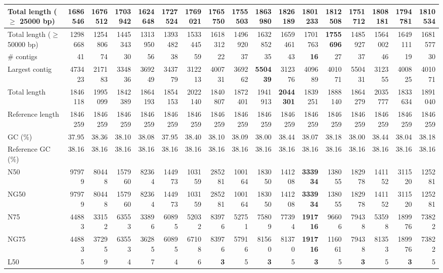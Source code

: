 \documentclass[12pt,a4paper]{article}
\begin{document}
\begin{table}[ht]
\begin{center}
\begin{tabular}{|l*{16}{|r}|}
Total length ($\geq$ 25000 bp) & 1686546 & 1676512 & 1703942 & 1624648 & 1727524 & 1769021 & 1765750 & 1755503 & {\bf 1863980} & 1826189 & 1801233 & 1812508 & 1751712 & 1808181 & 1794781 & 1810534 \\ \hline
Total length ($\geq$ 50000 bp) & 1298668 & 1254806 & 1445343 & 1313950 & 1393482 & 1533445 & 1618312 & 1496920 & 1632852 & 1659461 & 1701763 & {\bf 1755696} & 1485927 & 1564002 & 1649111 & 1681577 \\ \hline
\# contigs & 41 & 74 & 30 & 56 & 38 & 59 & 22 & 37 & 35 & 43 & {\bf 16} & 27 & 37 & 46 & 19 & 30 \\ \hline
Largest contig & 473423 & 217183 & 334836 & 369249 & 343779 & 312213 & 400731 & 369262 & {\bf 550439} & 312376 & 409689 & 401071 & 550431 & 312355 & 400825 & 401071 \\ \hline
Total length & 1846118 & 1995099 & 1842389 & 1864193 & 1854153 & 2022140 & 1840807 & 1872401 & 1941913 & {\bf 2044301} & 1839251 & 1888140 & 1864279 & 2035777 & 1833634 & 1891040 \\ \hline
Reference length & 1846259 & 1846259 & 1846259 & 1846259 & 1846259 & 1846259 & 1846259 & 1846259 & 1846259 & 1846259 & 1846259 & 1846259 & 1846259 & 1846259 & 1846259 & 1846259 \\ \hline
GC (\%) & 37.95 & 38.36 & 38.10 & 38.08 & 37.95 & 38.40 & 38.10 & 38.09 & 38.00 & 38.44 & 38.07 & 38.18 & 38.00 & 38.44 & 38.04 & 38.18 \\ \hline
Reference GC (\%) & 38.16 & 38.16 & 38.16 & 38.16 & 38.16 & 38.16 & 38.16 & 38.16 & 38.16 & 38.16 & 38.16 & 38.16 & 38.16 & 38.16 & 38.16 & 38.16 \\ \hline
N50 & 97979 & 80448 & 157960 & 82364 & 144973 & 103159 & 285281 & 100164 & 183050 & 141208 & {\bf 333934} & 138055 & 182978 & 141152 & 311520 & 125281 \\ \hline
NG50 & 97979 & 80448 & 157960 & 82364 & 144973 & 103159 & 285281 & 100164 & 183050 & 141208 & {\bf 333934} & 138055 & 182978 & 141152 & 311520 & 125281 \\ \hline
N75 & 44883 & 33152 & 63553 & 33896 & 60895 & 52032 & 83976 & 52751 & 75809 & 77394 & {\bf 191716} & 96606 & 79438 & 53598 & 189976 & 73822 \\ \hline
NG75 & 44883 & 37295 & 63553 & 36285 & 60895 & 67108 & 83976 & 57916 & 81560 & 81370 & {\bf 191716} & 116061 & 79438 & 81353 & 189976 & 73822 \\ \hline
L50 & 5 & 9 & 4 & 7 & 4 & 6 & {\bf 3} & 5 & {\bf 3} & 5 & {\bf 3} & 5 & {\bf 3} & 5 & {\bf 3} & 5 \\ \hline

\end{tabular}
\end{center}
\end{table}
\end{document}
